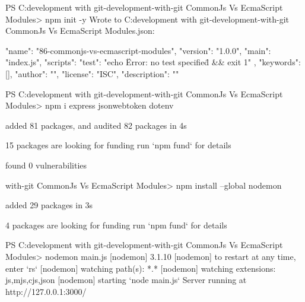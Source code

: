 



PS C:\Users\harsh\Downloads\html development with git\html-development-with-git CommonJs Vs EcmaScript Modules> npm init -y   
Wrote to C:\Users\harsh\Downloads\html development with git\html-development-with-git CommonJs Vs EcmaScript Modules\package.json:

{
  "name": "86-commonjs-vs-ecmascript-modules",
  "version": "1.0.0",
  "main": "index.js",
  "scripts": {
    "test": "echo \"Error: no test specified\" && exit 1"
  },
  "keywords": [],
  "author": "",
  "license": "ISC",
  "description": ""
}




PS C:\Users\harsh\Downloads\html development with git\html-development-with-git CommonJs Vs EcmaScript Modules> npm i express jsonwebtoken dotenv

added 81 packages, and audited 82 packages in 4s

15 packages are looking for funding
  run `npm fund` for details

found 0 vulnerabilities











with-git CommonJs Vs EcmaScript Modules> npm install --global nodemon

added 29 packages in 3s

4 packages are looking for funding
  run `npm fund` for details







  PS C:\Users\harsh\Downloads\html development with git\html-development-with-git CommonJs Vs EcmaScript Modules> nodemon main.js
[nodemon] 3.1.10
[nodemon] to restart at any time, enter `rs`
[nodemon] watching path(s): *.*
[nodemon] watching extensions: js,mjs,cjs,json
[nodemon] starting `node main.js`
Server running at http://127.0.0.1:3000/